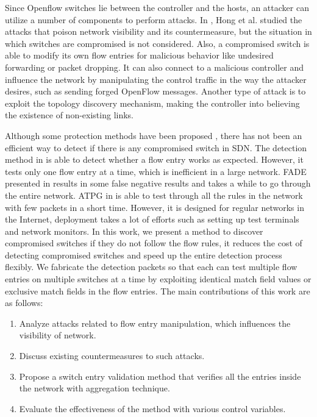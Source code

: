 \documentclass[conference]{IEEEtran}
\begin{document}
Since Openflow switches lie between the controller and the hosts, an attacker can utilize a number of components to perform attacks. In \cite{HXWG15}, Hong et al. studied the attacks that poison network visibility and its countermeasure, but the situation in which switches are compromised is not considered. Also, a compromised switch is able to modify its own flow entries for malicious behavior like undesired forwarding or packet dropping. It can also connect to a malicious controller and influence the network by manipulating the control traffic in the way the attacker desires, such as sending forged OpenFlow messages. Another type of attack is to exploit the topology discovery mechanism, making the controller into believing the existence of non-existing links.

Although some protection methods have been proposed \cite{CKGL15,PJL16}, there has not been an efficient way to detect if there is any compromised switch in SDN. The detection method in \cite{CKGL15} is able to detect whether a flow entry works as expected. However, it tests only one flow entry at a time, which is inefficient in a large network. FADE presented in \cite{PJL16} results in some false negative results and takes a while to go through the entire network. ATPG in \cite{ZKVM12} is able to test through all the rules in the network with few packets in a short time. However, it is designed for regular networks in the Internet, deployment takes a lot of efforts such as setting up test terminals and network monitors. In this work, we present a method to discover compromised switches if they do not follow the flow rules, it reduces the cost of detecting compromised switches and speed up the entire detection process flexibly. We fabricate the detection packets so that each can test multiple flow entries on multiple switches at a time by exploiting identical match field values or exclusive match fields in the flow entries. 
The main contributions of this work are as follows:

\begin{enumerate}
\item
Analyze attacks related to flow entry manipulation, which influences the visibility of network.
\item
Discuss existing countermeasures to such attacks.
\item
Propose a switch entry validation method that verifies all the entries inside the network with aggregation technique.
\item
Evaluate the effectiveness of the method with various control variables.
\end{enumerate}
\end{document}
